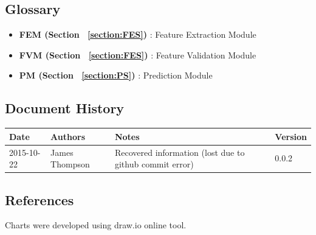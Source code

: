 \documentclass[10pt, twoside]{article}
\begin{document}
\subsection{Glossary}
\begin{itemize}
\item[] \textbf{FEM (Section ~\ref{section:FES})} : Feature Extraction Module
\item[] \textbf{FVM (Section ~\ref{section:FES})} : Feature Validation Module
\item[] \textbf{PM (Section ~\ref{section:PS})} : Prediction Module
\end{itemize}

\subsection{Document History}
\begin{tabular}{|p{}|p{}|p{}|p{}|} \hline
Date & Authors & Notes & Version \\ \hline
2015-10-22 & James Thompson & Recovered information (lost
due to github commit error) & 0.0.2 \\ \hline
\end{tabular}

\subsection{References}
Charts were developed using draw.io online tool.
\end{document}
